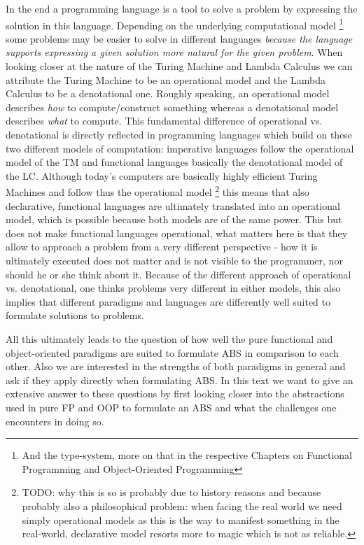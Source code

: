 In the end a programming language is a tool to solve a problem by expressing the solution in this language. Depending on the underlying computational model \footnote{And the type-system, more on that in the respective Chapters on Functional Programming and Object-Oriented Programming} some problems may be easier to solve in different languages \textit{because the language supports expressing a given solution more natural for the given problem}.
When looking closer at the nature of the Turing Machine and Lambda Calculus we can attribute the Turing Machine to be an operational model and the Lambda Calculus to be a denotational one. Roughly speaking, an operational model describes \textit{how} to compute/construct something whereas a denotational model describes \textit{what} to compute.
This fundamental difference of operational vs. denotational is directly reflected in programming languages which build on these two different models of computation: imperative languages follow the operational model of the TM and functional languages basically the denotational model of the LC.
Although today's computers are basically highly efficient Turing Machines and follow thus the operational model \footnote{TODO: why this is so is probably due to history reasons and because probably also a philosophical problem: when facing the real world we need simply operational models as this is the way to manifest something in the real-world, declarative model resorts more to magic which is not as reliable.} this means that also declarative, functional languages are ultimately translated into an operational model, which is possible because both models are of the same power. This but does not make functional languages operational, what matters here is that they allow to approach a problem from a very different perspective - how it is ultimately executed does not matter and is not visible to the programmer, nor should he or she think about it.
Because of the different approach of operational vs. denotational, one thinks problems very different in either models, this also implies that different paradigms and languages are differently well suited to formulate solutions to problems.

All this ultimately leads to the question of how well the pure functional and object-oriented paradigms are suited to formulate ABS in comparison to each other. Also we are interested in the strengths of both paradigms in general and ask if they apply directly when formulating ABS. In this text we want to give an extensive answer to these questions by first looking closer into the abstractions used in pure FP and OOP to formulate an ABS and what the challenges one encounters in doing so.

